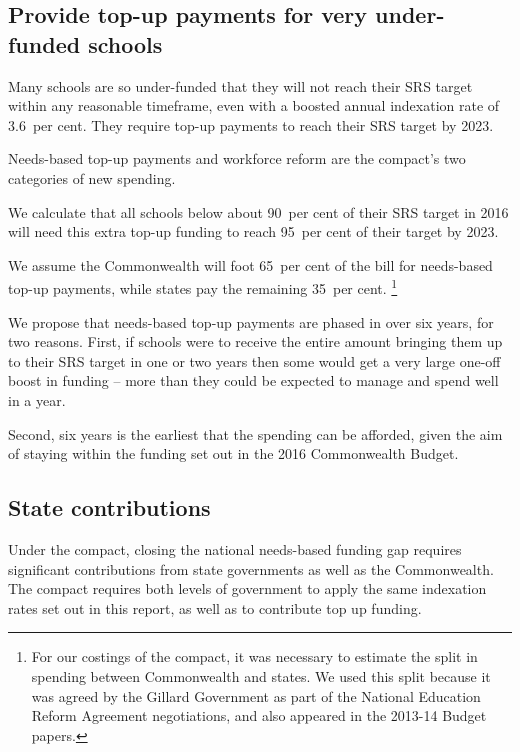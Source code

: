 \documentclass{grattan}
\begin{document}
\subsection{Provide top-up payments for very under-funded schools}\label{subsec:iv-provide-top-up-payments-for-highly-under-funded-schools}

Many schools are so under-funded that they will not reach their SRS target within any reasonable timeframe, even with a boosted annual indexation rate of 3.6~per cent.
They require top-up payments to reach their SRS target by 2023.

Needs-based top-up payments and workforce reform are the compact's two categories of new spending.

We calculate that all schools below about 90~per cent of their SRS target in 2016 will need this extra top-up funding to reach 95~per cent of their target by 2023.

We assume the Commonwealth will foot 65~per cent of the bill for needs-based top-up payments, while states pay the remaining 35~per cent.%
\footnote{For our costings of the compact, it was necessary to estimate the split in spending between Commonwealth and states.
We used this split because it was agreed by the Gillard Government as part of the National Education Reform Agreement negotiations, and also appeared in the 2013-14 Budget papers.}

We propose that needs-based top-up payments are phased in over six years, for two reasons.
First, if schools were to receive the entire amount bringing them up to their SRS target in one or two years then some would get a very large one-off boost in funding -- more than they could be expected to manage and spend well in a year.

Second, six years is the earliest that the spending can be afforded, given the aim of staying within the funding set out in the 2016 Commonwealth Budget.

\subsection{State contributions}\label{subsec:some-state-governments-will-need-to-step-up}

Under the compact, closing the national needs-based funding gap requires significant contributions from state governments as well as the Commonwealth.
The compact requires both levels of government to apply the same indexation rates set out in this report, as well as to contribute top up funding.
\end{document}
